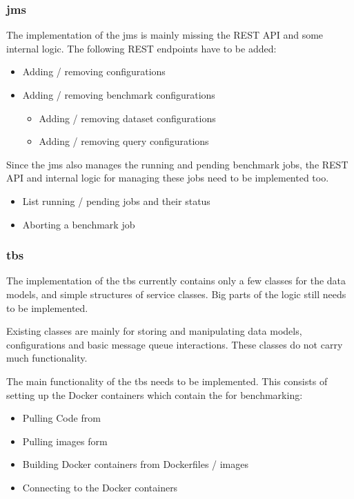 \subsubsection{\acl{jms}}
The implementation of the \acl{jms} is mainly missing the REST API and some internal logic.
The following REST endpoints have to be added:

\begin{itemize}
	\item Adding / removing \ts{} configurations
	
	\item Adding / removing benchmark configurations
		\begin{itemize}
			\item Adding / removing dataset configurations
			
			\item Adding / removing query configurations
		\end{itemize}
\end{itemize}

Since the \ac{jms} also manages the running and pending benchmark jobs, the REST API and internal logic for managing these jobs need to be implemented too.

\begin{itemize}
	\item List running / pending jobs and their status
	
	\item Aborting a benchmark job
\end{itemize}



\subsubsection{\acl{tbs}}
The implementation of the \acl{tbs} currently contains only a few classes for the data models, and simple structures of service classes.
Big parts of the logic still needs to be implemented.

Existing classes are mainly for storing and manipulating data models, configurations and basic message queue interactions.
These classes do not carry much functionality.

The main functionality of the \ac{tbs} needs to be implemented.
This consists of setting up the Docker containers which contain the \tsp{} for benchmarking:

\begin{itemize}
	\item Pulling Code from \gh{}
	\item Pulling images form \dockh{}
	
	\item Building Docker containers from Dockerfiles / images
	
	\item Connecting to the Docker containers
\end{itemize}

